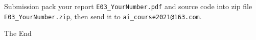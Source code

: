 \documentclass{beamer}
\begin{document}
\begin{frame}
  \begin{block}{Submission}
    pack your report \texttt{E03\_YourNumber.pdf} and source code into zip file \texttt{E03\_YourNumber.zip}, then send it to \texttt{ai\_course2021@163.com}.
  \end{block}
\end{frame}


\begin{frame}
  \Huge{\centerline{The End}}
\end{frame}

\end{document}
